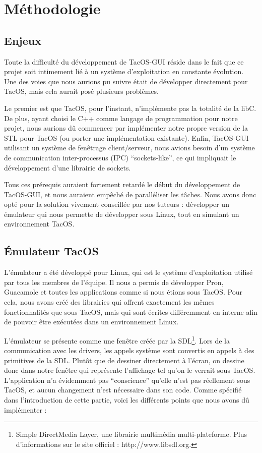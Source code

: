 \section{Méthodologie}

\subsection{Enjeux}

Toute la difficulté du développement de TacOS-GUI réside dans le fait que ce projet soit intimement lié à un système d'exploitation en constante évolution.
Une des voies que nous aurions pu suivre était de développer directement pour TacOS, mais cela aurait posé plusieurs problèmes.

Le premier est que TacOS, pour l'instant, n'implémente pas la totalité de la libC.
De plus, ayant choisi le C++ comme langage de programmation pour notre projet, nous aurions dû commencer par implémenter notre propre version de la STL pour TacOS (ou porter une implémentation existante).
Enfin, TacOS-GUI utilisant un système de fenêtrage client/serveur, nous avions besoin d'un système de communication inter-processus (IPC) ``sockets-like'', ce qui impliquait le développement d'une librairie de sockets.

Tous ces prérequis auraient fortement retardé le début du développement de TacOS-GUI, et nous auraient empêché de paralléliser les tâches.
Nous avons donc opté pour la solution vivement conseillée par nos tuteurs : développer un émulateur qui nous permette de développer sous Linux, tout en simulant un environnement TacOS.

\subsection{Émulateur TacOS}
\label{emulateur}

L'émulateur a été développé pour Linux, qui est le système d'exploitation utilisé par tous les membres de l'équipe.
Il nous a permis de développer Pron, Guacamole et toutes les applications comme si nous étions sous TacOS.
Pour cela, nous avons créé des librairies qui offrent exactement les mêmes fonctionnalités que sous TacOS, mais qui sont écrites différemment en interne afin de pouvoir être exécutées dans un environnement Linux.

L'émulateur se présente comme une fenêtre créée par la SDL\footnote{Simple DirectMedia Layer, une librairie multimédia multi-plateforme. Plus d'informations sur le site officiel : http://www.libsdl.org.}.
Lors de la communication avec les drivers, les appels système sont convertis en appels à des primitives de la SDL.
Plutôt que de dessiner directement à l'écran, on dessine donc dans notre fenêtre qui représente l'affichage tel qu'on le verrait sous TacOS.
L'application n'a évidemment pas ``conscience'' qu'elle n'est pas réellement sous TacOS, et aucun changement n'est nécessaire dans son code.
Comme spécifié dans l'introduction de cette partie, voici les différents points que nous avons dû implémenter :

